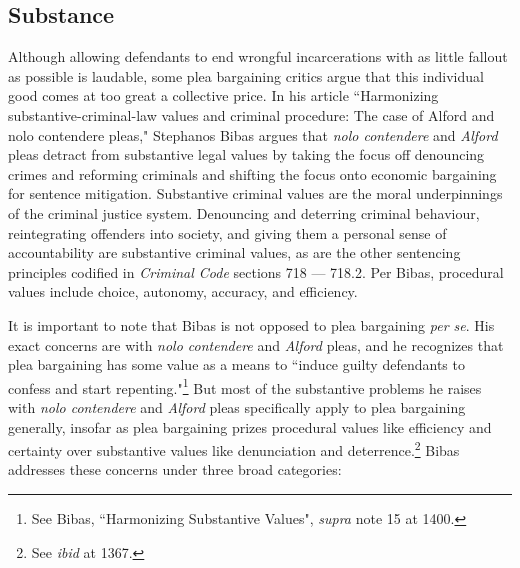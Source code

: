 \subsection{Substance}

Although allowing defendants to end wrongful incarcerations with as little fallout as possible is laudable, some plea bargaining critics argue that this individual good comes at too great a collective price. In his article ``Harmonizing substantive-criminal-law values and criminal procedure: The case of Alford and nolo contendere pleas," Stephanos Bibas argues that \textit{nolo contendere} and \textit{Alford} pleas detract from substantive legal values by taking the focus off denouncing crimes and reforming criminals and shifting the focus onto economic bargaining for sentence mitigation. Substantive criminal values are the moral underpinnings of the criminal justice system. Denouncing and deterring criminal behaviour, reintegrating offenders into society, and giving them a personal sense of accountability are substantive criminal values, as are the other sentencing principles codified in \textit{Criminal Code} sections 718 — 718.2. Per Bibas, procedural values include choice, autonomy, accuracy, and efficiency.

It is important to note that Bibas is not opposed to plea bargaining \textit{per se}. His exact concerns are with \textit{nolo contendere} and \textit{Alford} pleas, and he recognizes that plea bargaining has some value as a means to ``induce guilty defendants to confess and start repenting."\footnote{See Bibas, ``Harmonizing Substantive Values", \textit{supra} note 15 at 1400.} But most of the substantive problems he raises with \textit{nolo contendere} and \textit{Alford} pleas specifically apply to plea bargaining generally, insofar as plea bargaining prizes procedural values like efficiency and certainty over substantive values like denunciation and deterrence.\footnote{See \textit{ibid} at 1367.} Bibas addresses these concerns under three broad categories:

